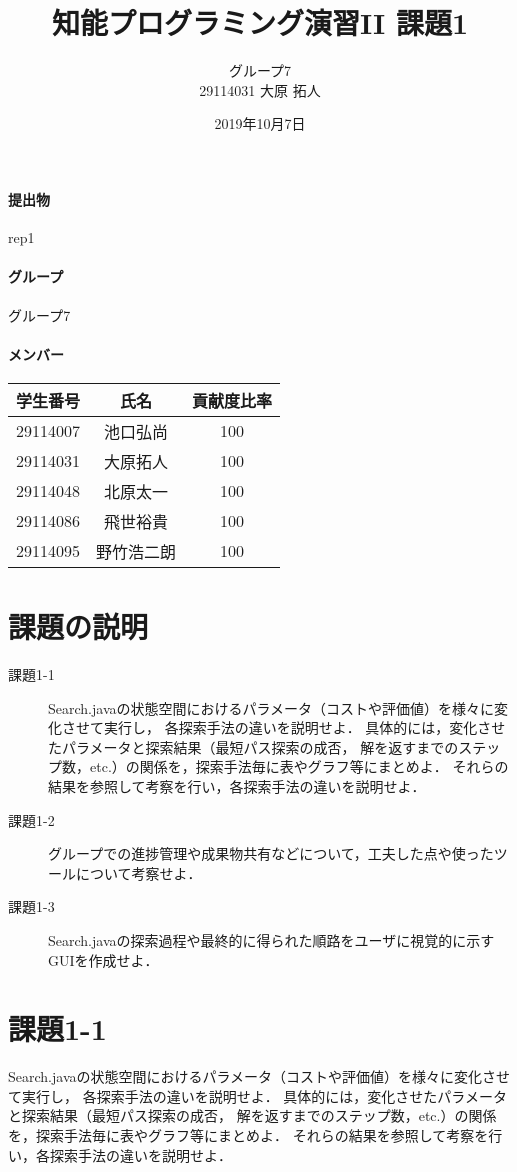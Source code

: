 \documentclass{jarticle}
\title{知能プログラミング演習II 課題1}
\author{グループ7\\
  29114031 大原 拓人\\
}
\date{2019年10月7日}
\begin{document}
\maketitle

\paragraph{提出物} rep1
\paragraph{グループ} グループ7
\paragraph{メンバー}
\begin{tabular}{|c|c|c|}
  \hline
  学生番号&氏名&貢献度比率\\
  \hline\hline
  29114007&池口弘尚&100\\
  \hline
  29114031&大原拓人&100\\
  \hline
  29114048&北原太一&100\\
  \hline
  29114086&飛世裕貴&100\\
  \hline
  29114095&野竹浩二朗&100\\
\end{tabular}

\section{課題の説明}
\begin{description}
\item[課題1-1] Search.javaの状態空間におけるパラメータ（コストや評価値）を様々に変化させて実行し，
  各探索手法の違いを説明せよ．
  具体的には，変化させたパラメータと探索結果（最短パス探索の成否，
  解を返すまでのステップ数，etc.）の関係を，探索手法毎に表やグラフ等にまとめよ．
  それらの結果を参照して考察を行い，各探索手法の違いを説明せよ．
\item[課題1-2] グループでの進捗管理や成果物共有などについて，工夫した点や使ったツールについて考察せよ．
\item[課題1-3] Search.javaの探索過程や最終的に得られた順路をユーザに視覚的に示すGUIを作成せよ．
\end{description}


\section{課題1-1}
\begin{screen}
  Search.javaの状態空間におけるパラメータ（コストや評価値）を様々に変化させて実行し，
  各探索手法の違いを説明せよ．
  具体的には，変化させたパラメータと探索結果（最短パス探索の成否，
  解を返すまでのステップ数，etc.）の関係を，探索手法毎に表やグラフ等にまとめよ．
  それらの結果を参照して考察を行い，各探索手法の違いを説明せよ．
\end{screen}
\end{document}
